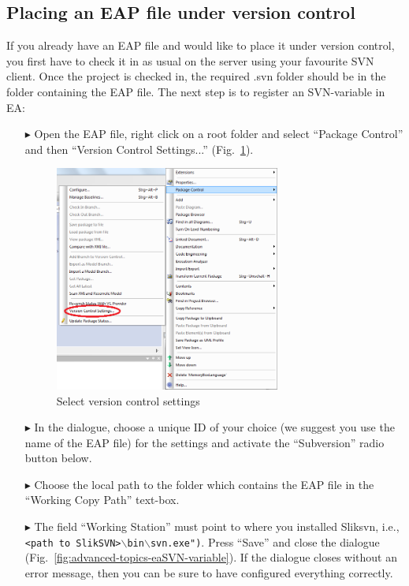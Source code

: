 \subsection{Placing an EAP file under version control}

If you already have an EAP file and would like to place it under version control, you first have to check it in as usual on the server using your favourite SVN
client. Once the project is checked in, the required .svn folder should be in the folder containing the EAP file. The next step is to register an SVN-variable
in EA:

\begin{enumerate}
  \item[$\blacktriangleright$] Open the EAP file, right click on a root folder and select ``Package Control'' and then ``Version Control Settings...''
  (Fig.~\ref{fig:advanced-topics-eaSVN-rightclick}).
  
\begin{figure}[!htbp]
\begin{center}
 	\includegraphics[width=0.7\textwidth]{rightclick}
	\caption{Select version control settings}
  	\label{fig:advanced-topics-eaSVN-rightclick}
\end{center}
\end{figure}

\newpage

  \item[$\blacktriangleright$] In the dialogue, choose a unique ID of your choice (we suggest you use the name of the EAP file) for the settings and activate
  the ``Subversion'' radio button below.
  \item[$\blacktriangleright$] Choose the local path to the folder which contains the EAP file in the ``Working Copy Path'' text-box.
  \item[$\blacktriangleright$] The field ``Working Station'' must point to where you installed Sliksvn, i.e., \texttt{<path to
  SlikSVN>$\backslash$bin$\backslash$svn.exe")}. Press ``Save'' and close the dialogue (Fig.~\ref{fig:advanced-topics-eaSVN-variable}). If the dialogue closes
  without an error message, then you can be sure to have configured everything correctly.


\end{enumerate}
